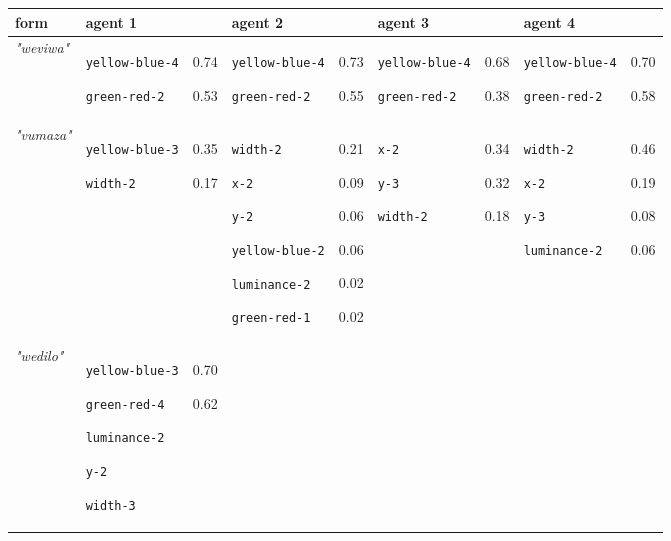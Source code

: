 
{\footnotesize\renewcommand{\arraystretch}{1.5}
\begin{tabular}{@{}p{1.2cm}|p{2.75cm}@{}p{0.8cm}@{}|p{2.75cm}@{}p{0.8cm}@{}|p{2.75cm}@{}p{0.8cm}@{}|p{2.75cm}@{}p{0.8cm}@{}}
form & agent 1 &  & agent 2 &  & agent 3 &  & agent 4 & \\
\hline
\textit{"weviwa"} & \texttt{yellow-blue-4}

\texttt{green-red-2} & 0.74

0.53 & \texttt{yellow-blue-4}

\texttt{green-red-2} & 0.73

0.55 & \texttt{yellow-blue-4}

\texttt{green-red-2} & 0.68

0.38 & \texttt{yellow-blue-4}

\texttt{green-red-2} & 0.70

0.58\\
\hline
\textit{"vumaza"} & \texttt{yellow-blue-3}

\texttt{width-2} & 0.35

0.17 & \texttt{width-2}

\texttt{x-2}

\texttt{y-2}

\texttt{yellow-blue-2}

\texttt{luminance-2}

\texttt{green-red-1} & 0.21

0.09

0.06

0.06

0.02

0.02 & \texttt{x-2}

\texttt{y-3}

\texttt{width-2} & 0.34

0.32

0.18 & \texttt{width-2}

\texttt{x-2}

\texttt{y-3}

\texttt{luminance-2} & 0.46

0.19

0.08

0.06\\
\hline
\textit{"wedilo"} & \texttt{yellow-blue-3}

\texttt{green-red-4}

\texttt{luminance-2}

\texttt{y-2}

\texttt{width-3} & 0.70

0.62


\end{tabular}}
